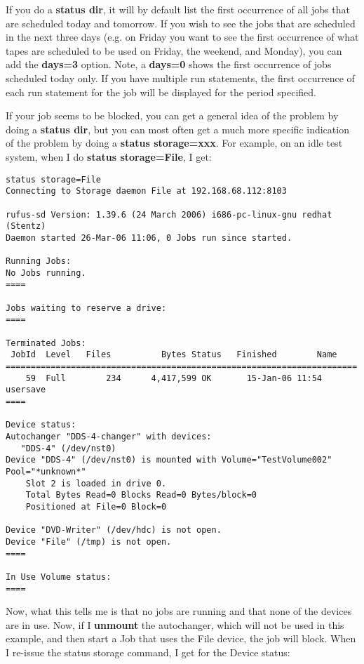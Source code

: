 \begin{description}
{   If you do a {\bf status dir}, it will by default list the first
   occurrence of all jobs that are scheduled today and tomorrow.  If you
   wish to see the jobs that are scheduled in the next three days (e.g.  on
   Friday you want to see the first occurrence of what tapes are scheduled
   to be used on Friday, the weekend, and Monday), you can add the {\bf
   days=3} option.  Note, a {\bf days=0} shows the first occurrence of jobs
   scheduled today only.  If you have multiple run statements, the first
   occurrence of each run statement for the job will be displayed for the
   period specified.

   If your job seems to be blocked, you can get a general idea of the
   problem by doing a {\bf status dir}, but you can most often get a
   much more specific indication of the problem by doing a
   {\bf status storage=xxx}.  For example, on an idle test system, when
   I do {\bf status storage=File}, I get:
\footnotesize
\begin{verbatim}
status storage=File
Connecting to Storage daemon File at 192.168.68.112:8103

rufus-sd Version: 1.39.6 (24 March 2006) i686-pc-linux-gnu redhat (Stentz)
Daemon started 26-Mar-06 11:06, 0 Jobs run since started.

Running Jobs:
No Jobs running.
====

Jobs waiting to reserve a drive:
====

Terminated Jobs:
 JobId  Level   Files          Bytes Status   Finished        Name
======================================================================
    59  Full        234      4,417,599 OK       15-Jan-06 11:54 usersave
====

Device status:
Autochanger "DDS-4-changer" with devices:
   "DDS-4" (/dev/nst0)
Device "DDS-4" (/dev/nst0) is mounted with Volume="TestVolume002"
Pool="*unknown*"
    Slot 2 is loaded in drive 0.
    Total Bytes Read=0 Blocks Read=0 Bytes/block=0
    Positioned at File=0 Block=0

Device "DVD-Writer" (/dev/hdc) is not open.
Device "File" (/tmp) is not open.
====

In Use Volume status:
====
\end{verbatim}
\normalsize

Now, what this tells me is that no jobs are running and that none of
the devices are in use.  Now, if I {\bf unmount} the autochanger, which
will not be used in this example, and then start a Job that uses the
File device, the job will block.  When I re-issue the status storage
command, I get for the Device status:

}
\end{description}
